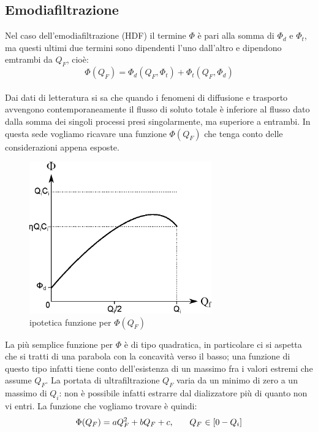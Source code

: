 \subsection{Emodiafiltrazione}
Nel caso dell'emodiafiltrazione (HDF) il termine $\Phi$ è pari alla somma di $\Phi_d$ e $\Phi_t$, ma questi ultimi due termini sono dipendenti l'uno dall'altro e dipendono emtrambi da $Q_F$, cioè:\\
\begin{equation}\label{phidf}
	\Phi(Q_F) = \Phi_d(Q_F,\Phi_t) + \Phi_t(Q_F,\Phi_d)
\end{equation}\\
Dai dati di letteratura si sa che quando i fenomeni di diffusione e trasporto avvengono contemporaneamente il flusso di soluto totale è inferiore al flusso dato dalla somma dei singoli processi presi singolarmente, ma superiore a entrambi.
In questa sede vogliamo ricavare una funzione $\Phi(Q_F)$ che tenga conto delle considerazioni appena esposte.\\
\begin{figure}[htbp]
	\centering
		\includegraphics[width=0.70\textwidth]{immagini/hp_hdf.eps}
	\caption{ipotetica funzione per $\Phi(Q_F)$}
	\label{fig:PHI}
\end{figure}
La più semplice funzione per $\Phi$ è di tipo quadratica, in particolare ci si aspetta che si tratti di una parabola con la concavità verso il basso; una funzione di questo tipo infatti tiene conto dell'esistenza di un massimo fra i valori estremi che assume $Q_F$. La portata di ultrafiltrazione $Q_F$ varia da un minimo di zero a un massimo di $Q_i$: non è possibile infatti estrarre dal dializzatore più di quanto non vi entri. La funzione che vogliamo trovare è quindi:\\
\begin{equation}\label{phi}
		\Phi(Q_F) = aQ_F^2 + bQ_F + c  \text{,\qquad$Q_F$ $\in[0-Q_i]$}
\end{equation}\\
